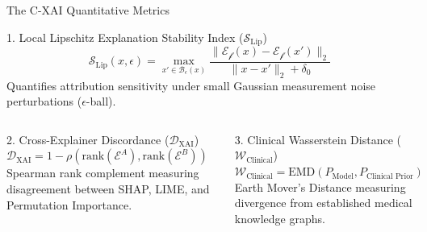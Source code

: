 \documentclass[aspectratio=169,10pt]{beamer}
\begin{document}
\begin{frame}{The C-XAI Quantitative Metrics}
  \begin{block}{1. Local Lipschitz Explanation Stability Index ($\mathcal{S}_{\text{Lip}}$)}
    \begin{equation*}
      \mathcal{S}_{\text{Lip}}(x, \epsilon) = \max_{x' \in \mathcal{B}_\epsilon(x)} \frac{\|\mathcal{E}_{\mathcal{f}}(x) - \mathcal{E}_{\mathcal{f}}(x')\|_2}{\|x - x'\|_2 + \delta_0}
    \end{equation*}
    Quantifies attribution sensitivity under small Gaussian measurement noise perturbations ($\epsilon$-ball).
  \end{block}

  \begin{columns}
    \begin{block}{2. Cross-Explainer Discordance ($\mathcal{D}_{\text{XAI}}$)}
      \small
      $\mathcal{D}_{\text{XAI}} = 1 - \rho(\text{rank}(\mathcal{E}^A), \text{rank}(\mathcal{E}^B))$ \\
      Spearman rank complement measuring disagreement between SHAP, LIME, and Permutation Importance.
    \end{block}

    \begin{block}{3. Clinical Wasserstein Distance ($\mathcal{W}_{\text{Clinical}}$)}
      \small
      $\mathcal{W}_{\text{Clinical}} = \text{EMD}(P_{\text{Model}}, P_{\text{Clinical Prior}})$ \\
      Earth Mover's Distance measuring divergence from established medical knowledge graphs.
    \end{block}
  \end{columns}
\end{frame}
\end{document}
